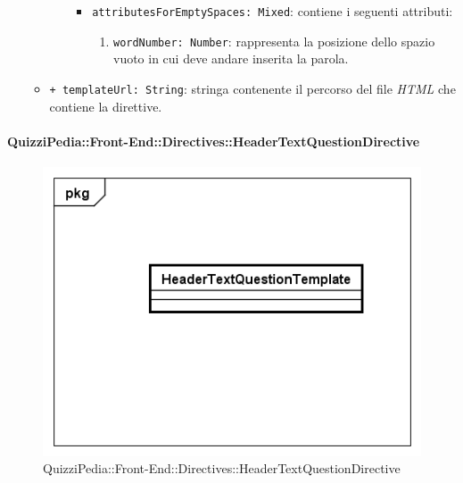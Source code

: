 \begin{itemize}
\begin{itemize}
\begin{itemize}
\begin{itemize}
						\item \texttt{attributesForEmptySpaces: Mixed}: contiene i seguenti attributi:
						\begin{enumerate}
							\item \texttt{wordNumber: Number}: rappresenta la posizione dello spazio vuoto in cui deve andare inserita la parola.
						\end{enumerate}
					\end{itemize}
				\end{itemize}
				\item \texttt{+ templateUrl: String}: stringa contenente il percorso del file \textit{HTML} che contiene la direttive.
			\end{itemize}
		\end{itemize}
		
		\paragraph{QuizziPedia::Front-End::Directives::HeaderTextQuestionDirective}
		
		\label{QuizziPedia::Front-End::Directives::HeaderTextQuestionDirective}
		
		\begin{figure}[ht]
			\centering
			\includegraphics[scale=0.5,keepaspectratio]{UML/Classi/Front-End/QuizziPedia_Front-end_Templates_HeaderTextQuestionTemplate.png}
			\caption{QuizziPedia::Front-End::Directives::HeaderTextQuestionDirective}
		\end{figure} \FloatBarrier
		
